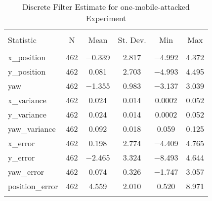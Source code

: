 
\begin{table}[htbp] \centering 
  \caption{Discrete Filter Estimate for one-mobile-attacked Experiment} 
  \label{tab:one_mobile_attacked_discrete_summary} 
\begin{tabular}{@{\extracolsep{5pt}}lccccc} 
\\[-1.8ex]\hline 
\hline \\[-1.8ex] 
Statistic & \multicolumn{1}{c}{N} & \multicolumn{1}{c}{Mean} & \multicolumn{1}{c}{St. Dev.} & \multicolumn{1}{c}{Min} & \multicolumn{1}{c}{Max} \\ 
\hline \\[-1.8ex] 
x\_position & 462 & $-$0.339 & \num{2.817} & $-$4.992 & \num{4.372} \\ 
y\_position & 462 & \num{0.081} & \num{2.703} & $-$4.993 & \num{4.495} \\ 
yaw & 462 & $-$1.355 & \num{0.983} & $-$3.137 & \num{3.039} \\ 
x\_variance & 462 & \num{0.024} & \num{0.014} & \num{0.0002} & \num{0.052} \\ 
y\_variance & 462 & \num{0.024} & \num{0.014} & \num{0.0002} & \num{0.052} \\ 
yaw\_variance & 462 & \num{0.092} & \num{0.018} & \num{0.059} & \num{0.125} \\ 
x\_error & 462 & \num{0.198} & \num{2.774} & $-$4.409 & \num{4.765} \\ 
y\_error & 462 & $-$2.465 & \num{3.324} & $-$8.493 & \num{4.644} \\ 
yaw\_error & 462 & \num{0.074} & \num{0.326} & $-$1.747 & \num{3.057} \\ 
position\_error & 462 & \num{4.559} & \num{2.010} & \num{0.520} & \num{8.971} \\ 
\hline \\[-1.8ex] 
\end{tabular} 
\end{table} 
